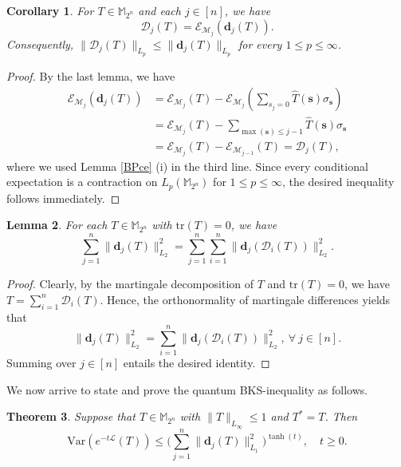 \documentclass{amsbook}
\newtheorem{theorem}{Theorem}[chapter]
\newtheorem{lemma}[theorem]{Lemma}
\newtheorem{corollary}[theorem]{Corollary}
\theoremstyle{definition}
\theoremstyle{remark}
\numberwithin{section}{chapter}
\numberwithin{equation}{chapter}
\newcommand{\M}{\mathbb{M}}
\newcommand{\1}{\mathbf{1}}
\newcommand{\dc}{\mathbf{d}}
\begin{document}
\begin{corollary}\label{cor-bdd-p}
	For $T\in \M_{2^{n}}$ and each $j\in [n]$, we have
	\begin{equation*}\label{conditonal expectation 3}
		\mathcal{D}_{j}(T)=\mathcal{E}_{\mathcal{M}_{j}}(\dc_{j}(T)).
	\end{equation*}
	Consequently, $\|\mathcal{D}_{j}(T)\|_{L_{p}}\leq \|\dc_{j}(T)\|_{L_{p}}$ for every $1\leq p\leq \infty$.
\end{corollary}

\begin{proof}
	By  the last lemma,  we have
	\begin{align*}
		\mathcal{E}_{\mathcal{M}_{j}}(\dc_{j}(T))&= \mathcal{E}_{\mathcal{M}_{j}}(T)-\mathcal{E}_{\mathcal{M}_{j}} \left( \sum_{s_{j}=0}\widehat{T}(\mathbf{s})\sigma_{\mathbf{s}}\right) \\
		&=\mathcal{E}_{\mathcal{M}_{j}}(T)- \sum_{\max(\mathbf{s})\leq j-1}\widehat{T}(\mathbf{s})\sigma_{\mathbf{s}}\\
		&= \mathcal{E}_{\mathcal{M}_{j}}(T)-\mathcal{E}_{\mathcal{M}_{j-1}}(T)=\mathcal{D}_{j}(T),
	\end{align*}
	where we used  Lemma \ref{BPce} (i) in the third line. Since every conditional expectation is a contraction on $L_p(\M_{2^{n}})$ for $1\leq  p\leq \infty$, the desired inequality follows immediately. 
\end{proof}

\begin{lemma}\label{decomposition}
	For each $T\in\M_{2^{n}}$ with $\mathrm{tr}(T)=0$, we have
	\begin{equation*}
		\sum\limits_{j=1}^{n}\|\dc_{j}(T)\|^{2}_{L_{2}}=\sum\limits_{j=1}^{n}\sum\limits_{i=1}^{n}\|\dc_{j}(\mathcal{D}_{i}(T))\|^{2}_{L_{2}}.
	\end{equation*}
\end{lemma}
\begin{proof}
	Clearly, by the martingale decomposition of $T$ and $\mathrm{tr}(T)=0$, we have $T=\sum_{i=1}^{n}\mathcal{D}_{i}(T)$. Hence, the orthonormality of martingale differences yields that
	\[
	\|\dc_{j}(T)\|^{2}_{L_{2}}=\sum_{i=1}^{n}\|\dc_{j}(\mathcal{D}_{i}(T))\|^{2}_{L_{2}},~\forall~j\in[n].
	\]
	Summing over $j\in[n]$ entails the desired identity.
\end{proof}



We now arrive to state and prove the quantum BKS-inequality as follows.
\begin{theorem}\label{geometric interpolations}
	Suppose that $T\in \M_{2^{n}}$ with $\|T\|_{L_{\infty}}\leq 1$ and $T^*=T$. Then
	\[
	\mathrm{Var}\left(e^{-t\mathcal{L}}(T)\right)\leq \Big(\sum\limits_{j=1}^{n}\|\dc_{j}(T)\|^{2}_{L_{1}}\Big)^{\tanh(t)},\quad t\geq 0.
	\]
\end{theorem}
\end{document}

